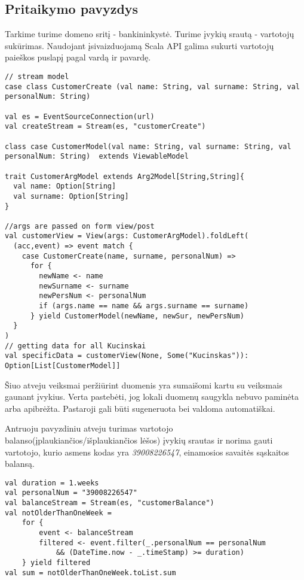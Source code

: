 \documentclass[12pt, a4paper, lithuanian]{article}
\begin{document}
\subsection{Pritaikymo pavyzdys}

    Tarkime turime domeno sritį - bankininkystė. Turime įvykių srautą - vartotojų sukūrimas. Naudojant įsivaizduojamą Scala API galima sukurti vartotojų paieškos puslapį pagal vardą ir pavardę.

\begin{lstlisting}
// stream model
case class CustomerCreate (val name: String, val surname: String, val personalNum: String)

val es = EventSourceConnection(url)
val createStream = Stream(es, "customerCreate")

class case CustomerModel(val name: String, val surname: String, val personalNum: String)  extends ViewableModel

trait CustomerArgModel extends Arg2Model[String,String]{
  val name: Option[String]
  val surname: Option[String]
}

//args are passed on form view/post
val customerView = View(args: CustomerArgModel).foldLeft(
  (acc,event) => event match {
    case CustomerCreate(name, surname, personalNum) =>
      for {
        newName <- name
        newSurname <- surname
        newPersNum <- personalNum
        if (args.name == name && args.surname == surname)
      } yield CustomerModel(newName, newSur, newPersNum)
  }
)
// getting data for all Kucinskai
val specificData = customerView(None, Some("Kucinskas")): Option[List[CustomerModel]]
\end{lstlisting}

    Šiuo atveju veiksmai peržiūrint duomenis yra sumaišomi kartu su veiksmais gaunant įvykius. Verta pastebėti, jog lokali duomenų saugykla nebuvo paminėta arba apibrėžta. Pastaroji gali būti sugeneruota bei valdoma automatiškai.

    Antruoju pavyzdiniu atveju turimas vartotojo balanso(įplaukiančios/išplaukiančios lėšos) įvykių srautas ir norima gauti vartotojo, kurio asmens kodas yra \emph{39008226547}, einamosios savaitės sąskaitos balansą.

\begin{lstlisting}
val duration = 1.weeks
val personalNum = "39008226547"
val balanceStream = Stream(es, "customerBalance")
val notOlderThanOneWeek =
    for {
        event <- balanceStream
        filtered <- event.filter(_.personalNum == personalNum
            && (DateTime.now - _.timeStamp) >= duration)
    } yield filtered
val sum = notOlderThanOneWeek.toList.sum
\end{lstlisting}
\end{document}
